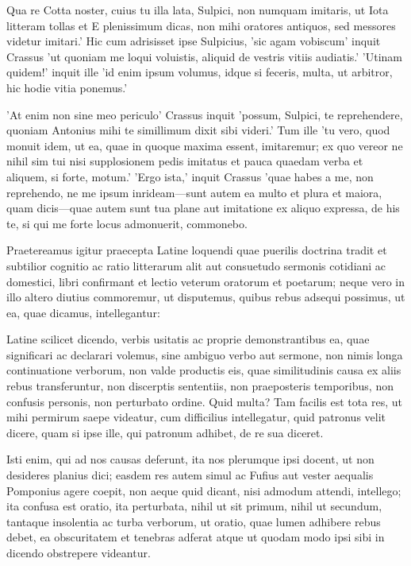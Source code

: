  Qua re Cotta noster, cuius tu illa lata, Sulpici, non numquam imitaris, ut Iota litteram tollas et E plenissimum dicas, non mihi oratores antiquos, sed messores videtur imitari.' Hic cum adrisisset ipse Sulpicius, 'sic agam vobiscum' inquit Crassus 'ut quoniam me loqui voluistis, aliquid de vestris vitiis audiatis.' 'Utinam quidem!' inquit ille 'id enim ipsum volumus, idque si feceris, multa, ut arbitror, hic hodie vitia ponemus.'

 'At enim non sine meo periculo' Crassus inquit 'possum, Sulpici, te reprehendere, quoniam Antonius mihi te simillimum dixit sibi videri.' Tum ille 'tu vero, quod monuit idem, ut ea, quae in quoque maxima essent, imitaremur; ex quo vereor ne nihil sim tui nisi supplosionem pedis imitatus et pauca quaedam verba et aliquem, si forte, motum.' 'Ergo ista,' inquit Crassus 'quae habes a me, non reprehendo, ne me ipsum inrideam—sunt autem ea multo et plura et maiora, quam dicis—quae autem sunt tua plane aut imitatione ex aliquo expressa, de his te, si qui me forte locus admonuerit, commonebo.

 Praetereamus igitur praecepta Latine loquendi quae puerilis doctrina tradit et subtilior cognitio ac ratio litterarum alit aut consuetudo sermonis cotidiani ac domestici, libri confirmant et lectio veterum oratorum et poetarum; neque vero in illo altero diutius commoremur, ut disputemus, quibus rebus adsequi possimus, ut ea, quae dicamus, intellegantur:

 Latine scilicet dicendo, verbis usitatis ac proprie demonstrantibus ea, quae significari ac declarari volemus, sine ambiguo verbo aut sermone, non nimis longa continuatione verborum, non valde productis eis, quae similitudinis causa ex aliis rebus transferuntur, non discerptis sententiis, non praeposteris temporibus, non confusis personis, non perturbato ordine. Quid multa? Tam facilis est tota res, ut mihi permirum saepe videatur, cum difficilius intellegatur, quid patronus velit dicere, quam si ipse ille, qui patronum adhibet, de re sua diceret.

 Isti enim, qui ad nos causas deferunt, ita nos plerumque ipsi docent, ut non desideres planius dici; easdem res autem simul ac Fufius aut vester aequalis Pomponius agere coepit, non aeque quid dicant, nisi admodum attendi, intellego; ita confusa est oratio, ita perturbata, nihil ut sit primum, nihil ut secundum, tantaque insolentia ac turba verborum, ut oratio, quae lumen adhibere rebus debet, ea obscuritatem et tenebras adferat atque ut quodam modo ipsi sibi in dicendo obstrepere videantur.


